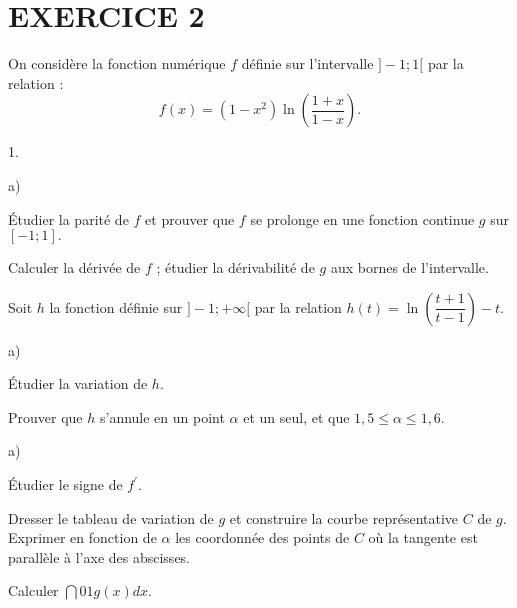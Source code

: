 \documentclass[11pt]{article}%
\begin{document}
\section*{EXERCICE 2}

On considère la fonction numérique $f$ définie sur l'intervalle
$]-1;1[$ par
la relation : 
\[
f(x) = (1-x^{2})\ln \left( {\dfrac{{1 + x}}{{1-x}}}\right).
\]

\begin{noliste}{1.}
 \setlength{\itemsep}{4mm}
\item 

\begin{noliste}{a)}
 \setlength{\itemsep}{2mm}
\item Étudier la parité de $f$ et prouver que $f$ se prolonge en une
fonction continue $g$ sur $[-1;1].$

\item Calculer la dérivée de $f$ ; étudier la dérivabilité de $g$ aux
bornes
de l'intervalle.
\end{noliste}

\item Soit $h$ la fonction définie sur $]-1; + \infty \lbrack $ par la
relation $h(t) = \ln \left( {\dfrac{{t + 1}}{{t-1}}}\right) -t$.

\begin{noliste}{a)}
 \setlength{\itemsep}{2mm}
\item Étudier la variation de $h$.

\item Prouver que $h$ s'annule en un point $\alpha $ et un seul, et que
$1,5\leq \alpha \leq 1,6.$
\end{noliste}

\item 

\begin{noliste}{a)}
 \setlength{\itemsep}{2mm}
\item Étudier le signe de $f^{\prime }.$

\item Dresser le tableau de variation de $g$ et construire la courbe
représentative $C$ de $g$.\\
Exprimer en fonction de $\alpha $ les coordonnée des points de $C$ où
la
tangente est parallèle à l'axe des abscisses.
\end{noliste}

\item Calculer $\dint{0}{1}g(x)dx.$
\end{noliste}
\end{document}
